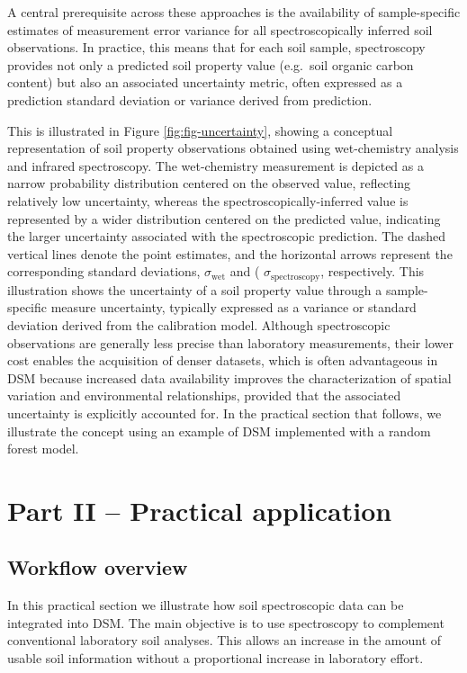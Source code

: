 \documentclass[
  10pt,
  b5paper,
  oneside]{book}
\begin{document}
A central prerequisite across these approaches is the availability of sample-specific estimates of measurement error variance for all spectroscopically inferred soil observations. In practice, this means that for each soil sample, spectroscopy provides not only a predicted soil property value (e.g.~soil organic carbon content) but also an associated uncertainty metric, often expressed as a prediction standard deviation or variance derived from prediction.

This is illustrated in Figure \ref{fig:fig-uncertainty}, showing a conceptual representation of soil property observations obtained using wet-chemistry analysis and infrared spectroscopy. The wet-chemistry measurement is depicted as a narrow probability distribution centered on the observed value, reflecting relatively low uncertainty, whereas the spectroscopically-inferred value is represented by a wider distribution centered on the predicted value, indicating the larger uncertainty associated with the spectroscopic prediction. The dashed vertical lines denote the point estimates, and the horizontal arrows represent the corresponding standard deviations, \(\sigma_{\mathrm{wet}}\) and ( \(\sigma_{\mathrm{spectroscopy}}\), respectively. This illustration shows the uncertainty of a soil property value through a sample-specific measure uncertainty, typically expressed as a variance or standard deviation derived from the calibration model. Although spectroscopic observations are generally less precise than laboratory measurements, their lower cost enables the acquisition of denser datasets, which is often advantageous in DSM because increased data availability improves the characterization of spatial variation and environmental relationships, provided that the associated uncertainty is explicitly accounted for. In the practical section that follows, we illustrate the concept using an example of DSM implemented with a random forest model.

\chapter{Part II -- Practical application}\label{part-ii-practical-application-1}

\section{Workflow overview}\label{workflow-overview}

In this practical section we illustrate how soil spectroscopic data can be integrated into DSM. The main objective is to use spectroscopy to complement conventional laboratory soil analyses. This allows an increase in the amount of usable soil information without a proportional increase in laboratory effort.
\end{document}
